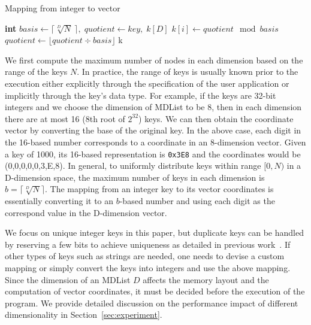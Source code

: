 \documentclass[10pt,journal,letterpaper,compsoc]{IEEEtran}
\begin{document}
\begin{algorithm}[ht]
    \caption{Mapping from integer to vector}
    \label{alg:mapping}
    \begin{algorithmic}[1]
        \State \textbf{int} $basis \gets \lceil\sqrt[D]{N}\:\rceil,\;quotient\gets key,\;k[D]$
        \For {$i \in (D, 0]$}
        \State $k[i] \gets quotient \mod basis$
        \State $quotient \gets \lfloor quotient \div basis \rfloor$
        \EndFor
        \State \Return k
        \EndFunction
    \end{algorithmic}
\end{algorithm}
We first compute the maximum number of nodes in each dimension based on the range of the keys $N$. 
In practice, the range of keys is usually known prior to the execution either explicitly through the specification of the user application or implicitly through the key's data type.
For example, if the keys are 32-bit integers and we choose the dimension of MDList to be 8, then in each dimension there are at most 16 (8th root of $2^{32}$) keys. 
We can then obtain the coordinate vector by converting the base of the original key. 
In the above case, each digit in the 16-based number corresponds to a coordinate in an 8-dimension vector.
Given a key of 1000, its 16-based representation is \texttt{0x3E8} and the coordinates would be (0,0,0,0,0,3,E,8).
In general, to uniformly distribute keys within range $[0,N)$ in a D-dimension space, the maximum number of keys in each dimension is $b=\lceil\sqrt[D]{N}\rceil$. 
The mapping from an integer key to its vector coordinates is essentially converting it to an $b$-based number and using each digit as the correspond value in the D-dimension vector.

We focus on unique integer keys in this paper, but duplicate keys can be handled by reserving a few bits to achieve uniqueness as detailed in previous work~\cite{fraser2007concurrent,sundell2005fast}.
If other types of keys such as strings are needed, one needs to devise a custom mapping or simply convert the keys into integers and use the above mapping.
Since the dimension of an MDList $D$ affects the memory layout and the computation of vector coordinates, it must be decided before the execution of the program.
We provide detailed discussion on the performance impact of different dimensionality in Section~\ref{sec:experiment}. 
\end{document}
